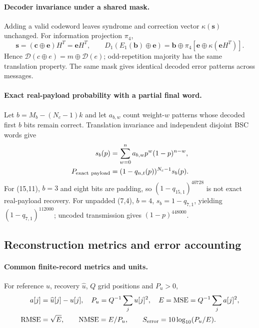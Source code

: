 \paragraph{Decoder invariance under a shared mask.}
Adding a valid codeword leaves syndrome and correction vector
$\kappa(\mathbf s)$ unchanged. For information projection $\pi_4$,
\begin{equation}
 \mathbf s=(\mathbf c\oplus\mathbf e)H^T=\mathbf eH^T,\qquad
 D_1(E_1(\mathbf b)\oplus\mathbf e)
 =\mathbf b\oplus\pi_4[\mathbf e\oplus\kappa(\mathbf eH^T)].
 \label{eq:r42-pair-invariant}
\end{equation}
Hence $\mathcal D(c\oplus e)=m\oplus\mathcal D(e)$; odd-repetition majority
has the same translation property. The same mask gives identical decoded
error patterns across messages.

\paragraph{Exact real-payload probability with a partial final word.}
Let $b=M_b-(N_c-1)k$ and let $a_{b,w}$ count weight-$w$ patterns whose
decoded first $b$ bits remain correct. Translation invariance and independent
disjoint BSC words give
\begin{align}
 s_b(p)&=\sum_{w=0}^n a_{b,w}p^w(1-p)^{n-w},\label{eq:r52-prefix}\\
 P_{\rm exact\ payload}
 &=(1-q_{n,t}(p))^{N_c-1}s_b(p).\label{eq:r52-payload}
\end{align}
For (15,11), $b=3$ and eight bits are padding, so
$(1-q_{15,1})^{40728}$ is not exact real-payload recovery.
For unpadded (7,4), $b=4$, $s_b=1-q_{7,1}$, yielding
$(1-q_{7,1})^{112000}$; uncoded transmission gives $(1-p)^{448000}$.

\subsection{Reconstruction metrics and error accounting}
\label{app:metrics}
\paragraph{Common finite-record metrics and units.}
For reference $u$, recovery $\widehat u$, $Q$ grid positions and $P_u>0$,
\begin{equation}
 \begin{aligned}
 a[j]&=\widehat u[j]-u[j],\quad P_u=Q^{-1}\sum_ju[j]^2,\quad
 E=\operatorname{MSE}=Q^{-1}\sum_ja[j]^2,\\
 \operatorname{RMSE}&=\sqrt E,\qquad \operatorname{NMSE}=E/P_u,\qquad
 S_{\rm error}=10\log_{10}(P_u/E).
 \end{aligned}
 \label{eq:r23-metrics}
\end{equation}

